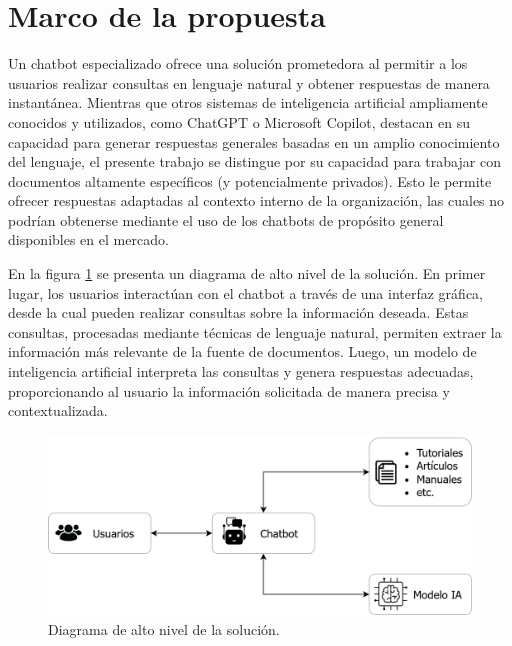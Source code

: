 \section{Marco de la propuesta}

Un chatbot especializado ofrece una solución prometedora al permitir a los usuarios realizar 
consultas en lenguaje natural y obtener respuestas de manera instantánea. Mientras que otros sistemas 
de inteligencia artificial ampliamente conocidos y utilizados, como ChatGPT o Microsoft Copilot, 
destacan en su capacidad para generar respuestas generales basadas en un amplio conocimiento del 
lenguaje, el presente trabajo se distingue por su capacidad para trabajar con documentos altamente 
específicos (y potencialmente privados). Esto le permite ofrecer respuestas adaptadas al contexto 
interno de la organización, las cuales no podrían obtenerse mediante el uso de los chatbots de 
propósito general disponibles en el mercado.

En la figura \ref{fig:diagrama-bloques-basico} se presenta un diagrama de alto nivel de la solución.
En primer lugar, los usuarios interactúan con el chatbot a través de una interfaz gráfica, desde la
cual pueden realizar consultas sobre la información deseada. Estas consultas, procesadas mediante 
técnicas de lenguaje natural, permiten extraer la información más relevante de la fuente de documentos. 
Luego, un modelo de inteligencia artificial interpreta las consultas y genera respuestas adecuadas, 
proporcionando al usuario la información solicitada de manera precisa y contextualizada.

\begin{figure}[ht]
	\centering
	\includegraphics[scale=.3]{./Figures/diagrama_bloques_basico.png}
	\caption{Diagrama de alto nivel de la solución.}
	\label{fig:diagrama-bloques-basico}
\end{figure}

